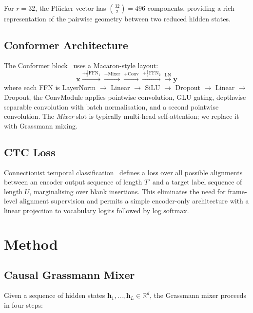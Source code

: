 \documentclass[11pt,a4paper]{article}
\newcommand{\R}{\mathbb{R}}
\newcommand{\plucker}{Pl\"{u}cker}
\begin{document}
For $r=32$, the \plucker{} vector has $\binom{32}{2} = 496$ components,
providing a rich representation of the pairwise geometry between two
reduced hidden states.

\subsection{Conformer Architecture}

The Conformer block~\citep{gulati2020conformer} uses a Macaron-style
layout:
\begin{equation}
  \bm{x} \xrightarrow{+\tfrac{1}{2}\mathrm{FFN}_1}
  \xrightarrow{+\mathrm{Mixer}}
  \xrightarrow{+\mathrm{Conv}}
  \xrightarrow{+\tfrac{1}{2}\mathrm{FFN}_2}
  \xrightarrow{\mathrm{LN}} \bm{y}
\end{equation}
where each FFN is LayerNorm $\to$ Linear $\to$ SiLU $\to$ Dropout $\to$
Linear $\to$ Dropout, the ConvModule applies pointwise convolution,
GLU gating, depthwise separable convolution with batch normalisation,
and a second pointwise convolution.  The \emph{Mixer} slot is typically
multi-head self-attention; we replace it with Grassmann mixing.

\subsection{CTC Loss}

Connectionist temporal classification~\citep{graves2006ctc} defines a
loss over all possible alignments between an encoder output sequence of
length $T'$ and a target label sequence of length $U$, marginalising
over blank insertions.  This eliminates the need for frame-level
alignment supervision and permits a simple encoder-only architecture
with a linear projection to vocabulary logits followed by
$\mathrm{log\_softmax}$.

\section{Method}
\label{sec:method}

\subsection{Causal Grassmann Mixer}

Given a sequence of hidden states $\bm{h}_1, \ldots, \bm{h}_L \in
\R^d$, the Grassmann mixer proceeds in four steps:
\end{document}
